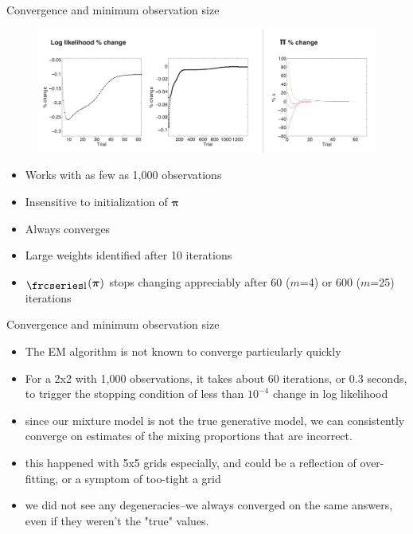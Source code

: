 \documentclass{beamer}
\newcommand{\textfrc}[1]{{\frcseries#1}}
\newcommand{\mathfrc}[1]{\raisebox{-0.8mm}{\text{\textfrc{\small #1}}}\hspace{0.4mm}}
\newcommand{\vect}[1]{\boldsymbol{\mathbf{#1}}}
\newcommand{\llp}{\mathfrc{l}(\vect{\pi})}
\begin{document}
\begin{frame}{Convergence and minimum observation size}
	
	\begin{figure}
			\begin{center}
				\includegraphics[width=\textwidth]{diag_simple.pdf}
			\end{center}
	\end{figure}
	
	\begin{itemize}
		\item Works with as few as 1,000 observations
		\item Insensitive to initialization of $\vect{\pi}$
		\item Always converges
		\item Large weights identified after 10 iterations
		\item $\llp$ stops changing appreciably after 60 ($m$=4) or 600 ($m$=25) iterations
	\end{itemize}

	
\end{frame}
\begin{frame}[shrink]{Convergence and minimum observation size}
		
	
	\begin{itemize}
		\item The EM algorithm is not known to converge particularly quickly
		\item For a 2x2 with 1,000 observations, it takes about 60 iterations, or 0.3 seconds, to trigger the stopping condition of less than $10^{-4}$ change in log likelihood
		
		\item since our mixture model is not the true generative model, we can consistently converge on estimates of the mixing proportions that are incorrect.
		\item this happened with 5x5 grids especially, and could be a reflection of over-fitting, or a symptom of too-tight a grid
		\item we did not see any degeneracies--we always converged on the same answers, even if they weren't the "true" values.
		
	\end{itemize}
	
\end{frame}
\end{document}
